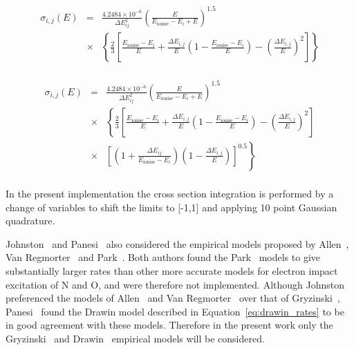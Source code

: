 \begin{eqnarray}
 \sigma_{i,j}(E) &=& \frac{4.2484 \times 10^{-6}}{\Delta E_{ij}^2}\left ( \frac{E}{E_{\text{ionise}} - E_{i} + E} \right )^{1.5} \nonumber \\ 
 &\times& \left \lbrace \frac{2}{3} \left [ \frac{E_{\text{ionise}} - E_{i}}{E} + \frac{\Delta E_{i,j}}{E} \left ( 1 - \frac{E_{\text{ionise}} - E_{i}}{E} \right ) - \left ( \frac{\Delta E_{i,j}}{E} \right )^{2} \right ] \right \rbrace  \nonumber \\ \label{eq:sigma_ij_1}
\end{eqnarray}

\begin{eqnarray}
 \sigma_{i,j}(E) &=& \frac{4.2484 \times 10^{-6}}{\Delta E_{ij}^2}\left ( \frac{E}{E_{\text{ionise}} - E_{i} + E} \right )^{1.5} \nonumber \\ 
 &\times& \left \lbrace \frac{2}{3} \left [ \frac{E_{\text{ionise}} - E_{i}}{E} + \frac{\Delta E_{i,j}}{E} \left ( 1 - \frac{E_{\text{ionise}} - E_{i}}{E} \right ) - \left ( \frac{\Delta E_{i,j}}{E} \right )^{2} \right ] \right . \nonumber \\
 &\times& \left . \left [ \left ( 1 + \frac{\Delta E_{ij} }{E_{\text{ionise}} - E_i} \right ) \left( 1 - \frac{\Delta E_{i,j}}{E} \right ) \right ]^{0.5} \right \rbrace \nonumber \\ \label{eq:sigma_ij_2}
\end{eqnarray}

\noindent In the present implementation the cross section integration is performed by a change of variables to shift the limits to [-1,1] and applying 10 point Gaussian quadrature.

\par

Johnston~\cite{JohnPhd} and Panesi~\cite{panesi_phd} also considered the empirical models proposed by Allen~\cite{Allen62}, Van Regmorter~\cite{VG62} and Park~\cite{Park73,park_1990}.
Both authors found the Park~\cite{Park73,park_1990} models to give substantially larger rates than other more accurate models for electron impact excitation of N and O, and were therefore not implemented.
Although Johnston~\cite{JohnPhd} preferenced the models of Allen~\cite{Allen62} and Van Regmorter~\cite{VG62} over that of Gryzinski~\cite{Gryz59}, Panesi~\cite{panesi_phd} found the Drawin model described in Equation~\ref{eq:drawin_rates}  to be in good agreement with these models.
Therefore in the present work only the Gryzinski~\cite{Gryz59} and Drawin~\cite{drawin_1968} empirical models will be considered.

